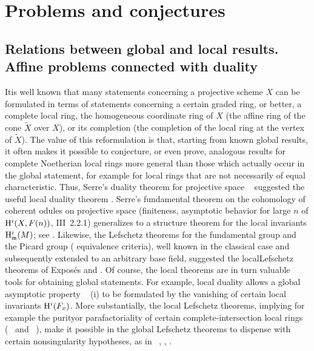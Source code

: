\chapter{Problems and conjectures} \label{XIII}

\section[Relations between global and local results]
{Relations between global and local results. Affine problems connected with duality} \label{XIII.1}

It\pageoriginale is well known that many statements concerning a projective scheme
$X$ can be formulated in terms of statements concerning
a certain graded ring, or better, a complete local ring,
 the homogeneous coordinate ring
of $X$ (\ie the affine ring of the cone $\tilde{X}$ over
$X$), or its completion (\ie the completion of the local ring at the vertex
of $\tilde{X}$). The value of this reformulation is that,
starting from known global results, it often makes it possible to
conjecture, or even prove, analogous results for complete
Noetherian local rings more general than those which
actually occur in the global statement, for example for
local rings that are not necessarily of equal
characteristic. Thus, Serre's duality theorem for
projective space ~ suggested the useful
local duality theorem . Serre's
fundamental theorem on the cohomology of coherent
odules on projective space (finiteness,
asymptotic behavior for large $n$ of $\mathrm H^i(X,
F(n))$, {\cf \EGA III~2.2.1}) generalizes to a
structure theorem for the local invariants $\mathrm H^i_{\mathfrak{m}}(M)$; see
. Likewise, the Lefschetz theorems
for the fundamental group and the Picard group (\og
equivalence criteria\fg), well known in the
classical case and subsequently extended to an arbitrary base field,
suggested the \og local\fg Lefschetz theorems of Exposés
 and . Of course, the local theorems are in
turn valuable tools for obtaining global statements.
For example, local duality allows a global asymptotic property
~ (i) to be formulated by the vanishing
of certain local invariants $\mathrm H^i(F_x)$. More
substantially, the local Lefschetz theorems, implying for
example the \og purity\fg or parafactoriality of certain
complete-intersection local rings (~ and
~), make it possible in the global
Lefschetz theorems to dispense with certain nonsingularity
hypotheses, as in ~, ,
.


